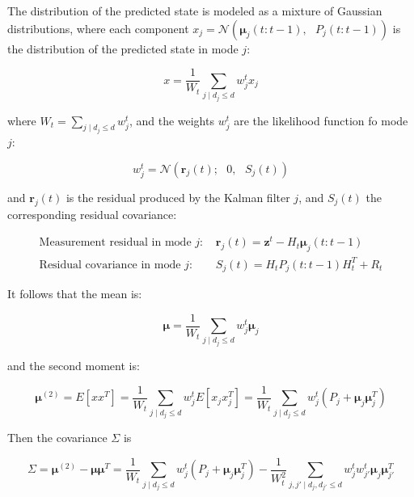 \documentclass[11pt]{article}
\numberwithin{equation}{section}
\numberwithin{figure}{section}
\numberwithin{table}{section}
\begin{document}
\noindent The distribution of the predicted state is modeled as a mixture of Gaussian distributions, where each component $x_{j}=\mathcal{N}(\boldsymbol\mu_{j}(t:t-1), \text{ }P_{j}(t:t-1))$ is the distribution of the predicted state in mode $j$:

\begin{equation}
x = \frac{1}{W_{t}}\sum_{j\mid d_{j}\leq d}{w_{j}^{t}x_{j}}
\label{eq:mixture2}
\end{equation}

\noindent where $W_{t}=\sum_{j\mid d_{j}\leq d}{w_{j}^{t}}$, and the weights $w_{j}^{t}$ are the likelihood function fo mode $j$:

\begin{equation}
w_{j}^{t} = \mathcal{N}(\boldsymbol r_{j}(t); \text{ }0, \text{ }S_{j}(t))
\label{eq:weightsMixture}
\end{equation}

\noindent and $\boldsymbol r_{j}(t)$ is the residual produced by the Kalman filter $j$, and $S_{j}(t)$ the corresponding residual covariance:

\begin{equation}
\begin{array}{ll}
\text{Measurement residual in mode $j$: } & \boldsymbol r_{j}(t) = \boldsymbol z^{t} - H_{t}\boldsymbol\mu_{j}(t:t-1)\\
\text{Residual covariance in mode $j$: } & S_{j}(t) = H_{t}P_{j}(t:t-1)H_{t}^{T}+R_{t}
\end{array}
\label{eq:weightsMixture2}
\end{equation}

\noindent It follows that the mean is:

\begin{equation}
\boldsymbol \mu = \frac{1}{W_{t}}\sum_{j\mid d_{j}\leq d}{w_{j}^{t}\boldsymbol\mu_{j}}
\label{eq:mixture3}
\end{equation}

\noindent and the second moment is:

\begin{equation}
\boldsymbol \mu^{(2)} = E\left[xx^{T}\right]= \frac{1}{W_{t}}\sum_{j\mid d_{j}\leq d}{w_{j}^{t}E\left[x_{j}x^{T}_{j}\right]} = \frac{1}{W_{t}}\sum_{j\mid d_{j}\leq d}{w_{j}^{t}\left(P_{j} + \boldsymbol\mu_{j} \boldsymbol\mu^{T}_{j}\right)}
\label{eq:mixture4}
\end{equation}

\noindent Then the covariance $\Sigma$ is

\begin{equation}
\Sigma = \boldsymbol\mu^{(2)} - \boldsymbol\mu \boldsymbol\mu^{T} = \frac{1}{W_{t}}\sum_{j\mid d_{j}\leq d}{w_{j}^{t}\left(P_{j} + \boldsymbol\mu_{j} \boldsymbol\mu^{T}_{j}\right)} - \frac{1}{W^{2}_{t}}\sum_{j,j'\mid d_{j},d_{j'}\leq d}{w_{j}^{t}w_{j'}^{t}\boldsymbol\mu_{j} \boldsymbol\mu^{T}_{j'}}
\label{eq:mixture5}
\end{equation}
\end{document}
